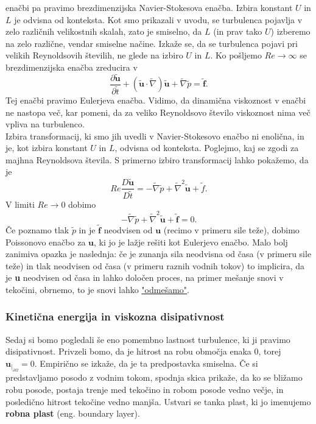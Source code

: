 \documentclass[mat2, tisk]{fmfdelo}
\newcommand{\bd}{\textbf}
\begin{document}
enačbi pa pravimo brezdimenzijska Navier-Stokesova enačba.
Izbira konstant $U$ in $L$ je odvisna od konteksta. Kot smo prikazali v uvodu, 
se turbulenca pojavlja v zelo različnih velikostnih skalah, zato je smiselno, da 
$L$ (in prav tako $U$) izberemo na zelo različne, vendar smiselne načine. Izkaže se, da se 
turbulenca pojavi pri velikih Reynoldsovih številih, ne glede na izbiro $U$ in $L$.
Ko pošljemo $Re \rightarrow \infty$ se brezdimenzijska enačba zreducira v 
\begin{equation}
\label{Euler NS}
\frac{\partial \widetilde{\bd{u}}}{\partial \widetilde{t}} + 
(\widetilde{\bd{u}} \cdot \widetilde{\nabla}) \widetilde{\bd{u}} + \widetilde{\nabla} \widetilde{p}
= \widetilde{\bd{f}}.
\end{equation}
Tej enačbi pravimo Eulerjeva enačba. Vidimo, da dinamična viskoznost v enačbi ne nastopa več,
kar pomeni, da za veliko Reynoldsovo število viskoznost nima več vpliva na turbulenco. \\

Izbira transformacij, ki smo jih uvedli v Navier-Stokesovo enačbo ni enolična, in je, kot 
izbira konstant $U$ in $L$, odvisna od konteksta. Poglejmo, kaj se zgodi za majhna 
Reynoldsova števila. S primerno izbiro transformacij lahko pokažemo, da je
\begin{equation*}
Re\frac{D\tilde{\bd{u}}}{D \tilde{t}} =  - \tilde{\nabla} \tilde{p}
+ \tilde{\nabla}^2 \tilde{\bd{u}} + \tilde{f}.
\end{equation*}
V limiti $Re \rightarrow 0$ dobimo
$$
- \widetilde{\nabla} \widetilde{p}+ \widetilde{\nabla}^2 \widetilde{\bd{u}} + \widetilde{\bd{f}} = 0.
$$
Če poznamo tlak $\tilde{p}$ in je $\tilde{\bd{f}}$ neodvisen od 
$\bd{u}$ (recimo v primeru sile teže), dobimo Poissonovo enačbo za 
$\bd{u}$, ki jo je lažje rešiti kot Eulerjevo enačbo.
Malo bolj zanimiva opazka je naslednja: če je zunanja sila 
neodvisna od časa (v primeru sile teže) in tlak 
neodvisen od časa (v primeru raznih vodnih tokov) to
implicira, da je \bd{u} neodvisen od časa in lahko
določen proces, na primer mešanje snovi v tekočini, 
obrnemo, to je snovi lahko \href{https://www.youtube.com/watch?v=h1DnrWEOWeg&feature=youtu.be}{"odmešamo"}.  

\subsubsection{Kinetična energija in viskozna disipativnost}

Sedaj si bomo pogledali še eno pomembno lastnost turbulence, ki ji pravimo disipativnost. 
Privzeli bomo, da je hitrost na robu območja enaka $0$, torej $\bd{u}_{|_{\partial\Omega}} = 0$. 
Empirično se izkaže, da je ta predpostavka smiselna. Če si predstavljamo posodo z 
vodnim tokom, spodnja skica prikaže, da ko se bližamo robu posode, postaja trenje med tekočino
in robom posode vedno večje, in posledično hitrost tekočine vedno manjša. Ustvari se tanka plast, 
ki jo imenujemo \textbf{robna plast} (eng. boundary layer). 
\end{document}
